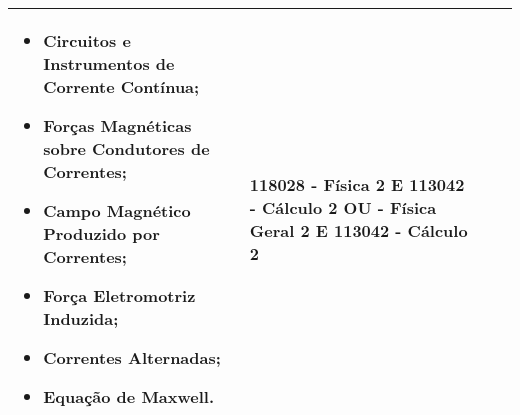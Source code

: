 \begin{longtable}{C{1,3cm}C{2,5cm}C{6,2cm}C{3,5cm}}
\begin{itemize}
		\item Circuitos e Instrumentos de Corrente Contínua;
		\item Forças Magnéticas sobre Condutores de Correntes;
		\item Campo Magnético Produzido por Correntes;
		\item Força Eletromotriz Induzida;
		\item Correntes Alternadas;
		\item Equação de Maxwell.
	\end{itemize} & 118028 - Física 2  E 113042 - Cálculo 2 \newline OU  - Física Geral 2  E 113042 - Cálculo 2\\ \hline
\end{longtable}

